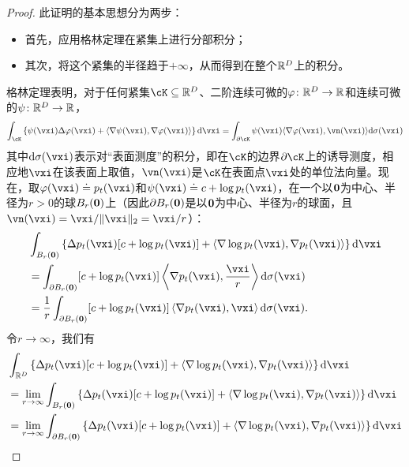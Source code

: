 \documentclass[../../book-main_zh.tex]{subfiles}
\begin{document}
\begin{proof}
    此证明的基本思想分为两步：
    \begin{itemize}
        \item 首先，应用格林定理在紧集上进行分部积分；
        \item 其次，将这个紧集的半径趋于\(+\infty\)，从而得到在整个\(\mathbb{R}^{D}\)上的积分。
    \end{itemize}
    格林定理表明，对于任何紧集\(\cK \subseteq \R^{D}\)、二阶连续可微的\(\plainphi \colon \R^{D} \to \R\)和连续可微的\(\psi \colon \mathbb{R}^{D} \to \mathbb{R}\)，
    \begin{equation}
        \int_{\cK}\bc{\psi(\vxi) \Delta \plainphi(\vxi) + \ip{\nabla \psi(\vxi)}{\nabla \plainphi(\vxi)}}\odif{\vxi} = \int_{\partial \cK}\psi(\vxi)\ip{\nabla \plainphi(\vxi)}{\vn(\vxi)}\odif{\sigma(\vxi)}
    \end{equation}
    其中\(\odif{\sigma(\vxi)}\)表示对“表面测度”的积分，即在\(\cK\)的边界\(\partial \cK\)上的诱导测度，相应地\(\vxi\)在该表面上取值，\(\vn(\vxi)\)是\(\cK\)在表面点\(\vxi\)处的单位法向量。现在，取\(\plainphi(\vxi) \doteq p_{t}(\vxi)\)和\(\psi(\vxi) \doteq c + \log p_{t}(\vxi)\)，在一个以\(\bm{0}\)为中心、半径为\(r > 0\)的球\(B_{r}(\bm{0})\)上（因此\(\partial B_{r}(\bm{0})\)是以\(\bm{0}\)为中心、半径为\(r\)的球面，且\(\vn(\vxi) = \vxi/\norm{\vxi}_{2} = \vxi/r\)）：
    \begin{align}
        &\int_{B_{r}(\vzero)}\bc{\Delta p_{t}(\vxi)[c + \log p_{t}(\vxi)] + \ip{\nabla \log p_{t}(\vxi)}{\nabla p_{t}(\vxi)}}\odif{\vxi} \\
        &= \int_{\partial B_{r}(\vzero)}[c + \log p_{t}(\vxi)]\ip*{\nabla p_{t}(\vxi)}{\frac{\vxi}{r}}\odif{\sigma(\vxi)} \\
        &= \frac{1}{r}\int_{\partial B_{r}(\vzero)}[c + \log p_{t}(\vxi)]\ip*{\nabla p_{t}(\vxi)}{\vxi}\odif{\sigma(\vxi)}.
    \end{align}
    令\(r \to \infty\)，我们有
    \begin{align}
        &\int_{\R^{D}}\bc{\Delta p_{t}(\vxi)[c + \log p_{t}(\vxi)] + \ip{\nabla \log p_{t}(\vxi)}{\nabla p_{t}(\vxi)}}\odif{\vxi} \label{eq:app_diffusion_r_infinity_limit} \\
        &= \lim_{r \to \infty}\int_{B_{r}(\vzero)}\bc{\Delta p_{t}(\vxi)[c + \log p_{t}(\vxi)] + \ip{\nabla \log p_{t}(\vxi)}{\nabla p_{t}(\vxi)}}\odif{\vxi} \\
        &= \lim_{r \to \infty}\int_{\partial B_{r}(\vzero)}\bc{\Delta p_{t}(\vxi)[c + \log p_{t}(\vxi)] + \ip{\nabla \log p_{t}(\vxi)}{\nabla p_{t}(\vxi)}}\odif{\vxi} \\ 

\end{align}
\end{proof}
\end{document}
